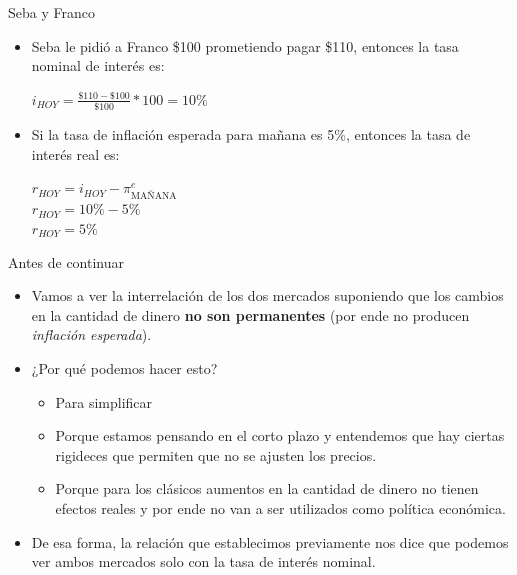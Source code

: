 \documentclass{beamer}
\begin{document}
\begin{frame}{Seba y Franco}
    \begin{itemize}
        \item Seba le pidió a Franco \$100 prometiendo pagar \$110, entonces la tasa nominal de interés es:
        \begin{center}
            $i_{HOY}=\frac{\$110 - \$100}{\$100} * 100 = 10\%$
        \end{center}
            \vspace{2mm}
        \item Si la tasa de inflación esperada para mañana es 5\%, entonces la tasa de interés real es: \\
        \begin{center}
            $r_{HOY} = i_{HOY}-\pi_{\text{MAÑANA}}^{e}$ \\
            \vspace{2mm}
            $r_{HOY} = 10\%-5\% $ \\
            \vspace{2mm}
            $r_{HOY} = 5\%$
        \end{center}
    \end{itemize}
\end{frame}

\begin{frame}{Antes de continuar}
    \begin{itemize}
        \item Vamos a ver la interrelación de los dos mercados suponiendo que los cambios en la cantidad de dinero \textbf{no son permanentes} (por ende no producen \textit{inflación esperada}).
        \item ¿Por qué podemos hacer esto?
        \begin{itemize}
            \item Para simplificar 
            \item Porque estamos pensando en el corto plazo y entendemos que hay ciertas rigideces que permiten que no se ajusten los precios.
            \item Porque para los clásicos aumentos en la cantidad de dinero no tienen efectos reales y por ende no van a ser utilizados como política económica.
        \end{itemize}
        \item De esa forma, la relación que establecimos previamente nos dice que podemos ver ambos mercados solo con la tasa de interés nominal.
    \end{itemize}
\end{frame}
\end{document}
